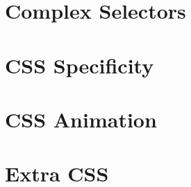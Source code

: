 \documentclass[b5paper,openany]{book}
\begin{document}
\chapter{Complex Selectors}


\chapter{CSS Specificity}


\chapter{CSS Animation}


\chapter{Extra CSS}





\end{document}
